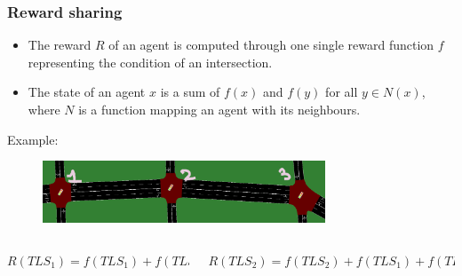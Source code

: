 \documentclass[dvipsnames]{beamer}
\begin{document}
\begin{frame}
\frametitle{Reward sharing}

  {\footnotesize
  \begin{itemize}
    \item The reward $R$ of an agent is computed through one single reward function $f$ representing the condition of an intersection. \\
    \item The state of an agent $x$ is a sum of $f(x)$ and $f(y)$ for all $y \in N(x)$, where $N$ is a function mapping an agent with its neighbours. \\
  \end{itemize}
  }

  Example:
  \begin{figure}
    \centering
    \includegraphics[width=0.75\textwidth]{figures/sumo-rf-tls-triplet.png}
  \end{figure}

  
  \begin{columns}
    \begin{column}{0.4\textwidth}
      \centering
      {\footnotesize$R({TLS}_{1}) = f({TLS}_{1}) + f({TLS}_{2})$}
    \end{column}
    \begin{column}{0.6\textwidth}
      \centering
      {\footnotesize$R({TLS}_{2}) = f({TLS}_{2}) + f({TLS}_{1}) + f({TLS}_{3})$}
    \end{column}
  \end{columns}
\end{frame}
\end{document}
